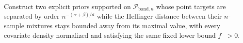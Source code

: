 Construct two explicit priors supported on \(\mathcal P_{\mathrm{band},n}\) whose point targets are separated by order \(n^{-(\alpha+\beta)/d}\) while the Hellinger distance between their \(n\)-sample mixtures stays bounded away from its maximal value, with every covariate density normalized and satisfying the same fixed lower bound \(f_->0\).